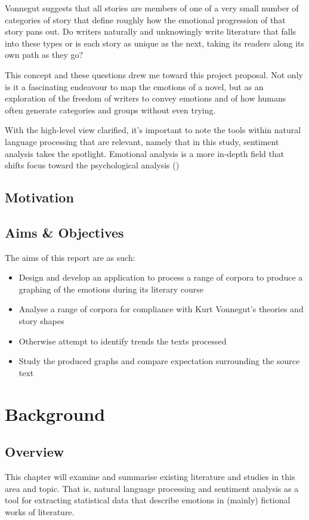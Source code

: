 \documentclass{article}
\begin{document}
        Vonnegut suggests that all stories are members of one of a very small number of categories of story that define roughly how the emotional progression of that story pans out. Do writers naturally and unknowingly write literature that falls into these types or is each story as unique as the next, taking its readers along its own path as they go?

        This concept and these questions drew me toward this project proposal. Not only is it a fascinating endeavour to map the emotions of a novel, but as an exploration of the freedom of writers to convey emotions and of how humans often generate categories and groups without even trying.

        With the high-level view clarified, it's important to note the tools within natural language processing that are relevant, namely that in this study, sentiment analysis takes the spotlight. Emotional analysis is a more in-depth field that shifts focus toward the psychological analysis (\cite{sentimentVsEmotionAnalysis})
    \subsection{Motivation}
    \subsection{Aims \& Objectives}
        The aims of this report are as such:
        \begin{itemize}
            \item Design and develop an application to process a range of corpora to produce a graphing of the emotions during its literary course
            \item Analyse a range of corpora for compliance with Kurt Vonnegut’s theories and story shapes
            \item Otherwise attempt to identify trends the texts processed
            \item Study the produced graphs and compare expectation surrounding the source text
        \end{itemize}
\newpage
\section{Background}
    \subsection{Overview}
        This chapter will examine and summarise existing literature and studies in this area and topic. That is, natural language processing and sentiment analysis as a tool for extracting statistical data that describe emotions in (mainly) fictional works of literature.
\end{document}
